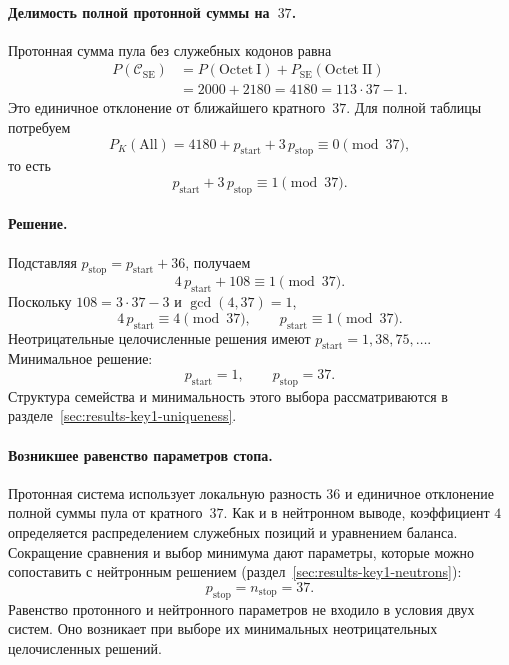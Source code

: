\documentclass[11pt,a4paper]{article}
\renewcommand{\_}{\origunderscore\allowbreak}
\begin{document}
\paragraph{Делимость полной протонной суммы на~$37$.}
Протонная сумма пула без служебных кодонов равна
\[
\begin{aligned}
P(\mathcal{C}_{\mathrm{SE}})
&=P(\mathrm{Octet~I})+P_{\mathrm{SE}}(\mathrm{Octet~II})\\
&=2000+2180=4180=113\cdot37-1.
\end{aligned}
\]
Это единичное отклонение от ближайшего кратного~$37$.
Для полной таблицы потребуем
\[
P_K(\mathrm{All})=
4180+p_{\text{start}}+3\,p_{\text{stop}}
\equiv0\pmod{37},
\]
то есть
\[
p_{\text{start}}+3\,p_{\text{stop}}\equiv1\pmod{37}.
\]

\paragraph{Решение.}
Подставляя $p_{\text{stop}}=p_{\text{start}}+36$, получаем
\[
4\,p_{\text{start}}+108\equiv1\pmod{37}.
\]
Поскольку $108=3\cdot37-3$ и $\gcd(4,37)=1$,
\[
4\,p_{\text{start}}\equiv4\pmod{37},
\qquad p_{\text{start}}\equiv1\pmod{37}.
\]
Неотрицательные целочисленные решения имеют
$p_{\text{start}}=1,38,75,\ldots$.
Минимальное решение:
\[
p_{\text{start}}=1,\qquad p_{\text{stop}}=37.
\]
Структура семейства и минимальность этого выбора
рассматриваются в разделе~\ref{sec:results-key1-uniqueness}.

\paragraph{Возникшее равенство параметров стопа.}
Протонная система использует локальную разность $36$ и
единичное отклонение полной суммы пула от кратного~$37$.
Как и в нейтронном выводе, коэффициент $4$ определяется
распределением служебных позиций и уравнением баланса.
Сокращение сравнения и выбор минимума дают параметры,
которые можно сопоставить с нейтронным решением
(раздел~\ref{sec:results-key1-neutrons}):
\[
p_{\text{stop}}=n_{\text{stop}}=37.
\]
Равенство протонного и нейтронного параметров не входило
в условия двух систем. Оно возникает при выборе их
минимальных неотрицательных целочисленных решений.
\end{document}
